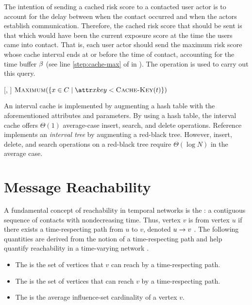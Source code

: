 The intention of sending a cached risk score to a contacted user actor is to account for the delay between when the contact occurred and when the actors establish communication. Therefore, the cached risk score that should be sent is that which would have been the current exposure score at the time the users came into contact. That is, each user actor should send the maximum risk score whose cache interval ends at or before the time of contact, accounting for the time buffer $\beta$ (see line \ref{step:cache-max} of \cSendCurrentOrCached in ). The operation \cCacheMax is used to carry out this query.
%
\begin{function}{\nCacheMax}[\vCache, \vTime]
    \State \Return $\cMaximum[\{\vCacheItem \in \vCache \mid \aCacheItemKey < \cCacheKey[\vTime]\}]$
\end{function}

An interval cache is implemented by augmenting a hash table \cite[pp. 253--285]{Cormen2009} with the aforementioned attributes and parameters. By using a hash table, the interval cache offers $\Theta(1)$ average-case insert, search, and delete operations. Reference \cite[pp. 348--354]{Cormen2009} implements an \emph{interval tree} by augmenting a red-black tree. However, insert, delete, and search operations on a red-black tree require $\Theta(\log N)$ in the average case.

\section{Message Reachability}\label{sec:reachability}
A fundamental concept of reachability in temporal networks is the : a contiguous sequence of contacts with nondecreasing time. Thus, vertex $v$ is  from vertex $u$ if there exists a time-respecting path from $u$ to $v$, denoted $u \rightarrow v$ \cite{Moody2002}. The following quantities are derived from the notion of a time-respecting path and help quantify reachability in a time-varying network \cite{Holme2012}.
%
\begin{itemize}
    \item The  is the set of vertices that $v$ can reach by a time-respecting path.
    \item The  is the set of vertices that can reach $v$ by a time-respecting path.
    \item The  is the average influence-set cardinality of a vertex $v$.
\end{itemize}

